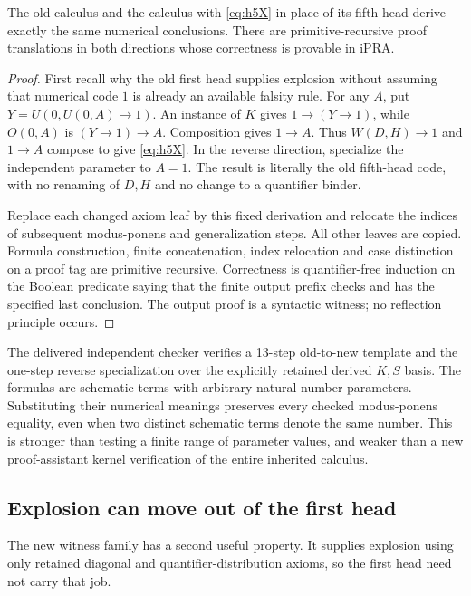 \begin{theorem}
The old calculus and the calculus with \eqref{eq:h5X} in place of its fifth
head derive exactly the same numerical conclusions.  There are
primitive-recursive proof translations in both directions whose
correctness is provable in iPRA.
\end{theorem}

\begin{proof}
First recall why the old first head supplies explosion without assuming
that numerical code $1$ is already an available falsity rule.  For any
$A$, put $Y=U(0,U(0,A)\to1)$.  An instance of $K$ gives
$1\to(Y\to1)$, while $O(0,A)$ is $(Y\to1)\to A$.  Composition gives
$1\to A$.  Thus $W(D,H)\to1$ and $1\to A$ compose to give
\eqref{eq:h5X}.  In the reverse direction, specialize the independent
parameter to $A=1$.  The result is literally the old fifth-head code,
with no renaming of $D,H$ and no change to a quantifier binder.

Replace each changed axiom leaf by this fixed derivation and relocate
the indices of subsequent modus-ponens and generalization steps.  All
other leaves are copied.  Formula construction, finite concatenation,
index relocation and case distinction on a proof tag are primitive
recursive.  Correctness is quantifier-free induction on the Boolean
predicate saying that the finite output prefix checks and has the
specified last conclusion.  The output proof is a syntactic witness;
no reflection principle occurs.
\end{proof}

The delivered independent checker verifies a 13-step old-to-new template
and the one-step reverse specialization over the explicitly retained
derived $K,S$ basis.  The formulas are schematic terms with arbitrary
natural-number parameters.  Substituting their numerical meanings
preserves every checked modus-ponens equality, even when two distinct
schematic terms denote the same number.  This is stronger than testing
a finite range of parameter values, and weaker than a new proof-assistant
kernel verification of the entire inherited calculus.

\subsection{Explosion can move out of the first head}

The new witness family has a second useful property.  It supplies
explosion using only retained diagonal and quantifier-distribution
axioms, so the first head need not carry that job.


